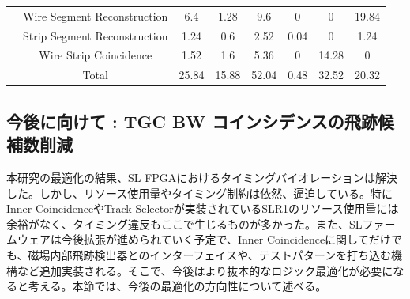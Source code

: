 \begin{table}[]
\begin{tabular}{|c|c|c|c|c|c|c|c|}
                                                                                & Wire Segment Reconstruction  & 6.4                                                       & 1.28                                                      & 9.6                                                      & 0                                                                 & 0                                                      & 19.84                                                  \\ \cline{2-8} 
                                                                                & Strip Segment Reconstruction & 1.24                                                      & 0.6                                                       & 2.52                                                     & 0.04                                                              & 0                                                      & 1.24                                                   \\ \cline{2-8} 
                                                                                & Wire Strip Coincidence       & 1.52                                                      & 1.6                                                       & 5.36                                                     & 0                                                                 & 14.28                                                  & 0                                                      \\ \cline{2-8} 
                                                                                & Total                        & 25.84                                                     & 15.88                                                     & 52.04                                                    & 0.48                                                              & 32.52                                                  & 20.32                                                  \\ \hline
    \end{tabular}
\end{table}

\subsection{今後に向けて : TGC BW コインシデンスの飛跡候補数削減}
本研究の最適化の結果、SL FPGAにおけるタイミングバイオレーションは解決した。しかし、リソース使用量やタイミング制約は依然、逼迫している。特にInner CoincidenceやTrack Selectorが実装されているSLR1のリソース使用量には余裕がなく、タイミング違反もここで生じるものが多かった。また、SLファームウェアは今後拡張が進められていく予定で、Inner Coincidenceに関してだけでも、磁場内部飛跡検出器とのインターフェイスや、テストパターンを打ち込む機構など追加実装される。そこで、今後はより抜本的なロジック最適化が必要になると考える。本節では、今後の最適化の方向性について述べる。

